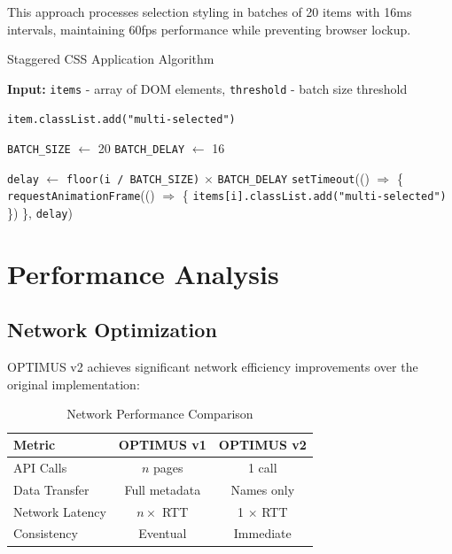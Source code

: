 \documentclass[10pt]{article}
\begin{document}
This approach processes selection styling in batches of 20 items with 16ms intervals, maintaining 60fps performance while preventing browser lockup.

\begin{algorithm}[H]
\caption{Staggered CSS Application Algorithm}
\label{algo:staggered-css}
\begin{algorithmic}[1]
    \State \textbf{Input:} \texttt{items} - array of DOM elements, \texttt{threshold} - batch size threshold
    
            \State \texttt{item.classList.add("multi-selected")}
        \EndFor
        \State \Return
    \EndIf
    
    \State \texttt{BATCH\_SIZE} $\gets$ 20
    \State \texttt{BATCH\_DELAY} $\gets$ 16 
    
        \State \texttt{delay} $\gets$ \texttt{floor(i / BATCH\_SIZE)} $\times$ \texttt{BATCH\_DELAY}
        \State \texttt{setTimeout}(() $\Rightarrow$ \{
            \State \quad \texttt{requestAnimationFrame}(() $\Rightarrow$ \{
                \State \quad \quad \texttt{items[i].classList.add("multi-selected")}
            \State \quad \})
        \State \}, \texttt{delay})
    \EndFor
\EndFunction
\end{algorithmic}
\end{algorithm}

\section{Performance Analysis}

\subsection{Network Optimization}

OPTIMUS v2 achieves significant network efficiency improvements over the original implementation:

\begin{table}[H]
\centering
\begin{tabular}{@{}lcc@{}}
\toprule
\textbf{Metric} & \textbf{OPTIMUS v1} & \textbf{OPTIMUS v2} \\
\midrule
API Calls & $n$ pages & 1 call \\
Data Transfer & Full metadata & Names only \\
Network Latency & $n \times$ RTT & 1 $\times$ RTT \\
Consistency & Eventual & Immediate \\
\bottomrule
\end{tabular}
\caption{Network Performance Comparison}
\end{table}
\end{document}
